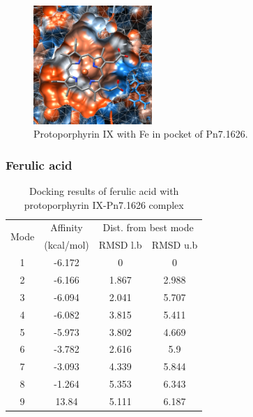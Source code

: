 \documentclass[12pt]{article}
\begin{document}
	\FloatBarrier
	
	\FloatBarrier
	\begin{figure}[h!]
		\centering
		\includegraphics[width=0.4\textwidth]{../5/propose/Dock/chimera.png}
		\caption{Protoporphyrin IX with Fe in pocket of Pn7.1626.}
		\label{fig5p_4}
	\end{figure}
	\FloatBarrier
	
	\subsubsection{Ferulic acid}
	
	\begin{table}
		\centering
		\caption{Docking results of ferulic acid with protoporphyrin IX-Pn7.1626 complex}
		\label{table5p_2}
		\begin{tabular}{cccc}
			\toprule
			\multirow{2}{*}{Mode} & Affinity & \multicolumn{2}{c}{Dist. from best mode}\\
			&  (kcal/mol) & RMSD l.b & RMSD u.b\\
			\midrule
			1 & -6.172   &       0   &       0\\
			2 & -6.166   &   1.867   &   2.988\\
			3 & -6.094   &   2.041   &   5.707\\
			4 & -6.082   &   3.815   &   5.411\\
			5 & -5.973   &   3.802   &   4.669\\
			6 & -3.782   &   2.616   &     5.9\\
			7 & -3.093   &   4.339   &   5.844\\
			8 & -1.264   &   5.353   &   6.343\\
			9 &  13.84   &   5.111   &   6.187\\
			\bottomrule
			
		\end{tabular}
	\end{table}
	
\end{document}
